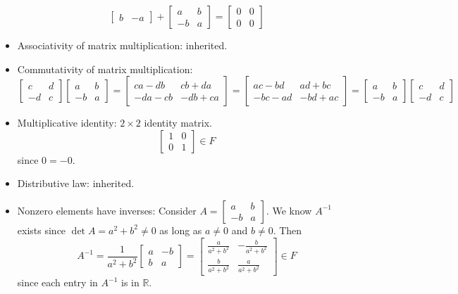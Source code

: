 \documentclass{amsart}
\begin{document}
\begin{itemize}
$$\begin{bmatrix}
		b & -a
		\end{bmatrix} +
		\begin{bmatrix}
		a & b \\
		-b & a
		\end{bmatrix} = \begin{bmatrix}
		0 & 0 \\
		0 & 0
		\end{bmatrix} $$
		\item Associativity of matrix multiplication: inherited.
		\item Commutativity of matrix multiplication:
		$$ \begin{bmatrix}
		c & d \\
		-d & c
		\end{bmatrix} 
		\begin{bmatrix}
		a & b \\
		-b & a
		\end{bmatrix} = \begin{bmatrix}
		ca-db & cb+da \\
		-da-cb & -db+ca
		\end{bmatrix} = \begin{bmatrix}
		ac-bd & ad+bc \\
		-bc-ad & -bd+ac
		\end{bmatrix} = 
		\begin{bmatrix}
		a & b \\
		-b & a
		\end{bmatrix} \begin{bmatrix}
		c & d \\
		-d & c
		\end{bmatrix}  $$
		\item Multiplicative identity: $2\times 2$ identity matrix.
		$$ \begin{bmatrix}
		1 & 0 \\
		0 & 1
		\end{bmatrix} \in F $$ since $0 = -0$.
		\item Distributive law: inherited.
		\item Nonzero elements have inverses:
		Consider $A = \begin{bmatrix}
		a & b \\
		-b & a
		\end{bmatrix}$. We know $A^{-1}$ exists since $\det A = a^2 + b^2 \neq 0$ as long as $a \neq 0$ and $b \neq 0$. Then $$A^{-1} = \frac{1}{a^2 + b^2}\begin{bmatrix}
		a & -b \\
		b & a
		\end{bmatrix} = \begin{bmatrix}
		\frac{a}{a^2 + b^2} & -\frac{b}{a^2 + b^2} \\
		\frac{b}{a^2 + b^2} & \frac{a}{a^2 + b^2} 
		\end{bmatrix} \in F $$ since each entry in $A^{-1}$ is in $\mathbb{R}$.
	\end{itemize}
\end{document}
